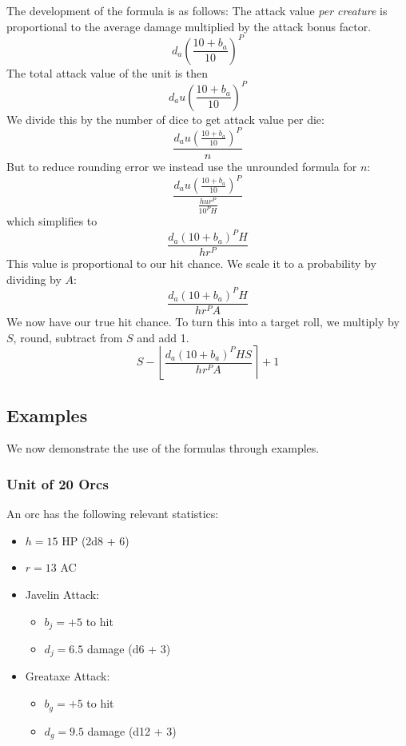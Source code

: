 \documentclass[twocolumn]{article}
\begin{document}
The development of the formula is as follows:
The attack value \emph{per creature} is proportional to
the average damage multiplied by the attack bonus factor.
\[
    d_a \left(\frac{10 + b_{a}}{10}\right)^{P}
\]
The total attack value of the unit is then 
\[
    d_a u \left(\frac{10 + b_{a}}{10}\right)^{P}
\]
We divide this by the number of dice to get attack value per die: 
\[
    \frac
        {d_a u \left(\frac{10 + b_{a}}{10}\right)^{P}}
        {n}
\]
But to reduce rounding error we instead use the unrounded formula for $n$: 
\[
    \frac
        {d_a u \left(\frac{10 + b_{a}}{10}\right)^{P}}
        {\frac{h u r^P}{10^P H}}
\]
which simplifies to 
\[
    \frac
        {d_a (10 + b_{a})^P H}
        {h r^P}
\]
This value is proportional to our hit chance.
We scale it to a probability by dividing by $A$:
\[
    \frac
        {d_a (10 + b_{a})^P H}
        {h r^P A}
\]
We now have our true hit chance.
To turn this into a target roll,
we multiply by $S$, round, subtract from $S$ and add 1.
\[
    S -
    \left\lfloor
        \frac
            {d_a (10 + b_{a})^P H S}
            {h r^P A}
    \right\rceil
    + 1
\]

\subsection{Examples}\label{sec:examples}

We now demonstrate the use of the formulas through examples.

\subsubsection{Unit of 20 Orcs}

An orc has the following relevant statistics:
\begin{itemize}
    \item $h = 15$ HP (2d8 + 6)
    \item $r = 13$ AC
    \item Javelin Attack:
        \begin{itemize}
            \item $b_j = +5$ to hit
            \item $d_j = 6.5$ damage (d6 + 3)
        \end{itemize}
    \item Greataxe Attack:
        \begin{itemize}
            \item $b_g = +5$ to hit
            \item $d_g = 9.5$ damage (d12 + 3)
        \end{itemize}
\end{itemize}
\end{document}
